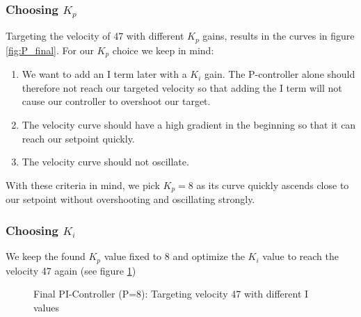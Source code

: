 \subsubsection*{Choosing $K_p$}
Targeting the velocity of 47 with different $K_p$ gains, results in the curves in figure \ref{fig:P_final}. 
For our $K_p$ choice we keep in mind:
\begin{enumerate}
    \item We want to add an I term later with a $K_i$ gain. The P-controller alone should therefore not reach our targeted velocity so that adding the I term will not cause our controller to overshoot our target.
    \item The velocity curve should have a high gradient in the beginning so that it can reach our setpoint quickly.
    \item The velocity curve should not oscillate.
\end{enumerate}
With these criteria in mind, we pick $K_p = 8$ as its curve quickly ascends close to our setpoint without overshooting and oscillating strongly.

\subsubsection*{Choosing $K_i$}
We keep the found $K_p$ value fixed to 8 and optimize the $K_i$ value to reach the velocity 47 again (see figure \ref{fig:I_final})

\begin{figure}[H]
    \centering
{}
    \caption{Final PI-Controller (P=8): Targeting velocity 47 with different I values} \label{fig:I_final}
\end{figure}

